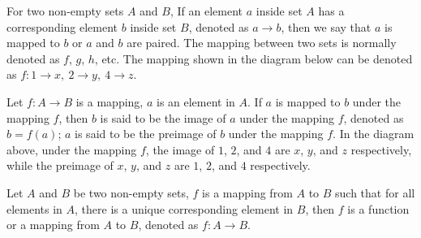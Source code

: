\documentclass[12pt]{report}
\begin{document}
\singlespacing{}

\doublespacing{}
\tableofcontents
\singlespacing{}
\newpage

\onehalfspacing

\begin{multicols}{2}

  For two non-empty sets $A$ and $B$, If an element $a$ inside set $A$ has a
  corresponding element $b$ inside set $B$, denoted as $a \to b$, then we say
  that $a$ is mapped to $b$ or $a$ and $b$ are paired. The mapping between two
  sets is normally denoted as $f$, $g$, $h$, etc. The mapping shown in the
  diagram below can be denoted as $f:1 \to x,\ 2 \to y,\ 4 \to z$.
  \begin{center}
  \end{center}
\end{multicols}

Let $f:A \to B$ is a mapping, $a$ is an element in $A$. If $a$ is mapped to $b$
under the mapping $f$, then $b$ is said to be the image of $a$ under the
mapping $f$, denoted as $b = f (a)$; $a$ is said to be the preimage of $b$
under the mapping $f$. In the diagram above, under the mapping $f$, the image
of $1$, $2$, and $4$ are $x$, $y$, and $z$ respectively, while the preimage of
$x$, $y$, and $z$ are $1$, $2$, and $4$ respectively.

\begin{mdframed}[style=MyFrame]
  Let $A$ and $B$ be two non-empty sets, $f$ is a mapping from $A$ to $B$ such that for all elements in $A$, there is a unique corresponding element in $B$, then $f$ is a function or a mapping from $A$ to $B$, denoted as $f:A \to B$.
\end{mdframed}
\end{document}
